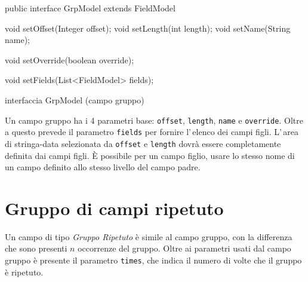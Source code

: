 \documentclass[a4paper,10pt]{report}
\newif\ifesource
\newenvironment{elisting}[1][H]
  {\captionsetup{aboveskip=0pt}\begin{listing}[#1]}
  {\end{listing}%
}
\begin{document}
\ifesource
\begin{figure*}[!htb]
\begin{lstlisting}[language=java, 
caption=interfaccia GrpModel (campo gruppo), 
label=lst:GrpModel]
public interface GrpModel extends FieldModel {
    void setOffset(Integer offset);
    void setLength(int length);
    void setName(String name);
    
    void setOverride(boolean override);
    
    void setFields(List<FieldModel> fields);
}
\end{lstlisting}\index{GrpModel}
\end{figure*}
\else
\begin{elisting}[!htb]
\begin{javacode}
public interface GrpModel extends FieldModel {
    void setOffset(Integer offset);
    void setLength(int length);
    void setName(String name);
    
    void setOverride(boolean override);
    
    void setFields(List<FieldModel> fields);
}
\end{javacode}
\caption{interfaccia GrpModel (campo gruppo)}
\label{lst:GrpModel}
\end{elisting}
\fi

Un campo gruppo ha i 4 parametri base: \verb!offset!, \verb!length!, 
\verb!name! e \verb!override!.
Oltre a questo prevede il parametro \verb!fields! per fornire l'\,elenco dei 
campi figli.
L'\,area di stringa-data selezionata da \verb!offset! e \verb!length! dovrà
essere completamente definita dai campi figli.
È possibile per un campo figlio, usare lo stesso nome di un campo definito
allo stesso livello del campo padre. 

\section{Gruppo di campi ripetuto}
Un campo di tipo \textsl{Gruppo Ripetuto} è simile al campo gruppo, con la 
differenza che sono presenti $n$ occorrenze del gruppo.
Oltre ai parametri usati dal campo gruppo è presente il parametro \verb!times!,
che indica il numero di volte che il gruppo è ripetuto.
\end{document}
